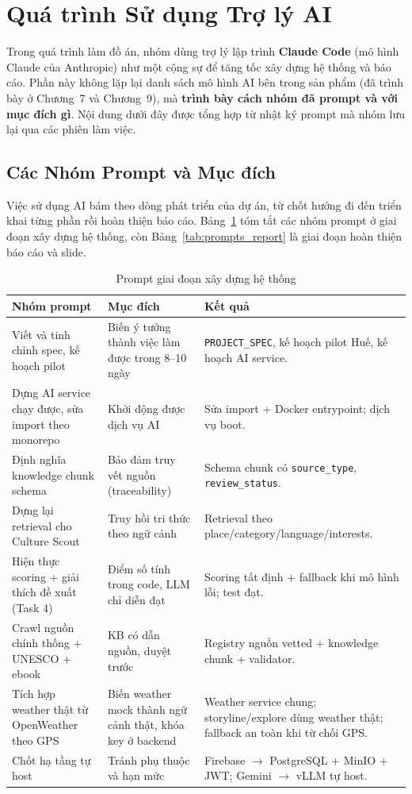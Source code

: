 \section{Quá trình Sử dụng Trợ lý AI}

Trong quá trình làm đồ án, nhóm dùng trợ lý lập trình \textbf{Claude Code}
(mô hình Claude của Anthropic) như một cộng sự để tăng tốc xây dựng hệ
thống và báo cáo. Phần này không lặp lại danh sách mô hình AI bên trong
sản phẩm (đã trình bày ở Chương~7 và Chương~9), mà \textbf{trình bày cách
nhóm đã prompt và với mục đích gì}. Nội dung dưới đây được tổng hợp từ
nhật ký prompt mà nhóm lưu lại qua các phiên làm việc.

\subsection{Các Nhóm Prompt và Mục đích}
\contrib

Việc sử dụng AI bám theo dòng phát triển của dự án, từ chốt hướng đi đến
triển khai từng phần rồi hoàn thiện báo cáo. Bảng~\ref{tab:prompts_build}
tóm tắt các nhóm prompt ở giai đoạn xây dựng hệ thống, còn
Bảng~\ref{tab:prompts_report} là giai đoạn hoàn thiện báo cáo và slide.

\begin{table}[H]
\centering
\caption{Prompt giai đoạn xây dựng hệ thống}
\label{tab:prompts_build}
\begin{tabularx}{\textwidth}{>{\raggedright\arraybackslash}p{4.4cm} >{\raggedright\arraybackslash}p{3.6cm} X}
\toprule
\textbf{Nhóm prompt} & \textbf{Mục đích} & \textbf{Kết quả} \\
\midrule
Viết và tinh chỉnh spec, kế hoạch pilot & Biến ý tưởng thành việc làm được trong 8--10 ngày & \texttt{PROJECT\_SPEC}, kế hoạch pilot Huế, kế hoạch AI service. \\
Dựng AI service chạy được, sửa import theo monorepo & Khởi động được dịch vụ AI & Sửa import + Docker entrypoint; dịch vụ boot. \\
Định nghĩa knowledge chunk schema & Bảo đảm truy vết nguồn (traceability) & Schema chunk có \texttt{source\_type}, \texttt{review\_status}. \\
Dựng lại retrieval cho Culture Scout & Truy hồi tri thức theo ngữ cảnh & Retrieval theo place/category/language/interests. \\
Hiện thực scoring + giải thích đề xuất (Task 4) & Điểm số tính trong code, LLM chỉ diễn đạt & Scoring tất định + fallback khi mô hình lỗi; test đạt. \\
Crawl nguồn chính thống + UNESCO + ebook & KB có dẫn nguồn, duyệt trước & Registry nguồn vetted + knowledge chunk + validator. \\
Tích hợp weather thật từ OpenWeather theo GPS & Biến weather mock thành ngữ cảnh thật, khóa key ở backend & Weather service chung; storyline/explore dùng weather thật; fallback an toàn khi từ chối GPS. \\
Chốt hạ tầng tự host & Tránh phụ thuộc và hạn mức & Firebase $\to$ PostgreSQL + MinIO + JWT; Gemini $\to$ vLLM tự host. \\
\bottomrule
\end{tabularx}
\end{table}

